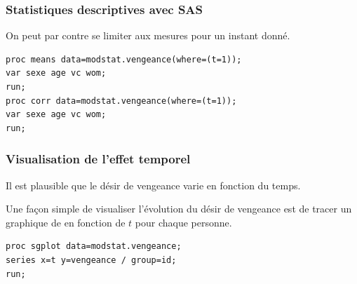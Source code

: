 \documentclass{beamer}
\begin{document}
\begin{frame}[fragile]
\frametitle{Statistiques descriptives avec SAS}
On peut par contre se limiter aux mesures pour un instant donné.
\begin{tcolorbox}[colback=white, colframe=hecblue, title=Code SAS pour calculer les statistiques descriptives]
\begin{verbatim}
proc means data=modstat.vengeance(where=(t=1)); 
var sexe age vc wom; 
run; 
proc corr data=modstat.vengeance(where=(t=1)); 
var sexe age vc wom; 
run;
\end{verbatim}
\end{tcolorbox}

\end{frame}

\begin{frame}[fragile]
\frametitle{Visualisation de l'effet temporel}
\bi \item 
 Il est plausible que le désir de vengeance varie en fonction du temps. 
 \item Une façon simple de visualiser l'évolution du désir de vengeance est de tracer un graphique de  en fonction de $t$ \alert{pour chaque personne}.
\ei
\begin{tcolorbox}[colback=white, colframe=hecblue, title=Code \SASlang{} pour dessiner un graphique spaghetti]
\begin{verbatim}
proc sgplot data=modstat.vengeance;
series x=t y=vengeance / group=id;
run;
\end{verbatim}
\end{tcolorbox}

\end{frame}
\end{document}
